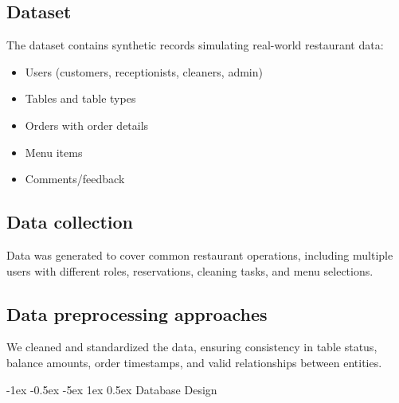 \documentclass[12pt]{article}
\makeatletter
\renewcommand\section{\@startsection{section}{1}{\z@}%
    {-1ex \@plus -0.5ex \@minus -5ex} %
    {1ex \@plus 0.5ex} %
    {\normalfont\Large\bfseries}} %
\makeatother
\begin{document}
\subsection{Dataset}
The dataset contains synthetic records simulating real-world restaurant data:
\begin{itemize}
    \item Users (customers, receptionists, cleaners, admin)
    \item Tables and table types
    \item Orders with order details
    \item Menu items
    \item Comments/feedback
\end{itemize}

\subsection{Data collection}
Data was generated to cover common restaurant operations, including multiple users with different roles, reservations, cleaning tasks, and menu selections.

\subsection{Data preprocessing approaches}
We cleaned and standardized the data, ensuring consistency in table status, balance amounts, order timestamps, and valid relationships between entities.

\section{Database Design}
\end{document}

